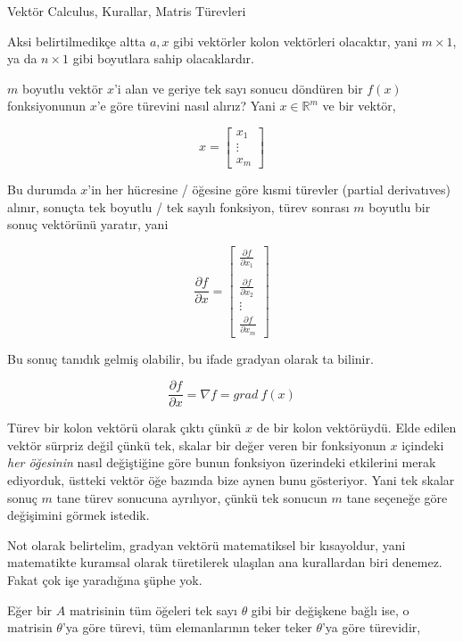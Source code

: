 \documentclass[12pt,fleqn]{article}\usepackage{../../common}
\begin{document}
Vektör Calculus, Kurallar, Matris Türevleri

Aksi belirtilmedikçe altta $a,x$ gibi vektörler kolon vektörleri olacaktır,
yani $m \times 1$, ya da $n \times 1$ gibi boyutlara sahip olacaklardır. 

$m$ boyutlu vektör $x$'i alan ve geriye tek sayı sonucu döndüren bir $f(x)$
fonksiyonunun $x$'e göre türevini nasıl alırız? Yani $x \in \mathbb{R}^m$
ve bir vektör,

$$ x = 
\left[\begin{array}{ccc}
x_1 \\ \vdots \\ x_m
\end{array}\right]
 $$

Bu durumda $x$'in her hücresine / öğesine göre kısmi türevler (partial
derivatıves) alınır, sonuçta tek boyutlu / tek sayılı fonksiyon, türev 
sonrası $m$ boyutlu bir sonuç vektörünü yaratır, yani

$$
\frac{\partial f}{\partial x}  =
\left[\begin{array}{c}
\frac{\partial f}{\partial x_1} \\
\\
\frac{\partial f}{\partial x_2} \\
\vdots \\
\frac{\partial f}{\partial x_m} 
\end{array}\right]
$$

Bu sonuç tanıdık gelmiş olabilir, bu ifade gradyan olarak ta bilinir. 

$$ \frac{\partial f}{\partial x}  = \nabla f = grad \ f(x) $$

Türev bir kolon vektörü olarak çıktı çünkü $x$ de bir kolon
vektörüydü. Elde edilen vektör sürpriz değil çünkü tek, skalar bir değer
veren bir fonksiyonun $x$ içindeki {\em her öğesinin} nasıl değiştiğine
göre bunun fonksiyon üzerindeki etkilerini merak ediyorduk, üstteki vektör
öğe bazında bize aynen bunu gösteriyor. Yani tek skalar sonuç $m$ tane
türev sonucuna ayrılıyor, çünkü tek sonucun $m$ tane seçeneğe göre
değişimini görmek istedik. 

Not olarak belirtelim, gradyan vektörü matematiksel bir kısayoldur, yani
matematikte kuramsal olarak türetilerek ulaşılan ana kurallardan biri
denemez. Fakat çok işe yaradığına şüphe yok.

Eğer bir $A$ matrisinin tüm öğeleri tek sayı $\theta$ gibi bir değişkene
bağlı ise, o matrisin $\theta$'ya göre türevi, tüm elemanlarının teker
teker $\theta$'ya göre türevidir,
\end{document}
